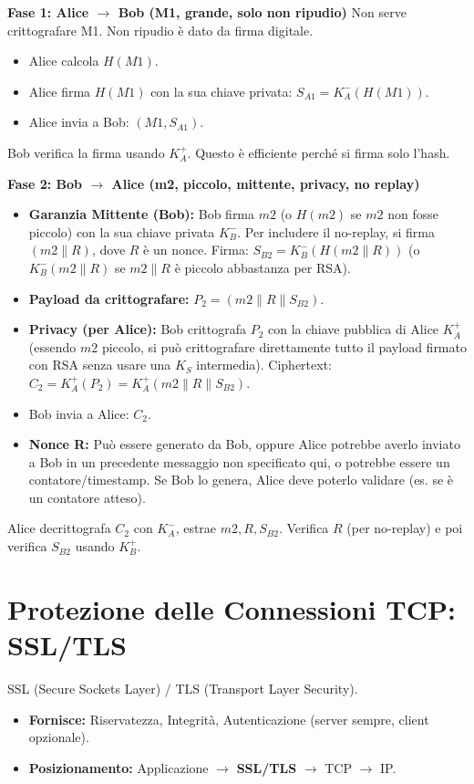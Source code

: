 \textbf{Fase 1: Alice $\rightarrow$ Bob (M1, grande, solo non ripudio)}
Non serve crittografare M1. Non ripudio è dato da firma digitale.
\begin{itemize}
    \item Alice calcola $H(M1)$.
    \item Alice firma $H(M1)$ con la sua chiave privata: $S_{A1} = K_A^-(H(M1))$.
    \item Alice invia a Bob: $(M1, S_{A1})$.
\end{itemize}
Bob verifica la firma usando $K_A^+$. Questo è efficiente perché si firma solo l'hash.

\textbf{Fase 2: Bob $\rightarrow$ Alice (m2, piccolo, mittente, privacy, no replay)}
\begin{itemize}
    \item \textbf{Garanzia Mittente (Bob):} Bob firma $m2$ (o $H(m2)$ se $m2$ non fosse piccolo) con la sua chiave privata $K_B^-$. Per includere il no-replay, si firma $(m2 \| R)$, dove $R$ è un nonce. Firma: $S_{B2} = K_B^-(H(m2 \| R))$ (o $K_B^-(m2 \| R)$ se $m2 \| R$ è piccolo abbastanza per RSA).
    \item \textbf{Payload da crittografare:} $P_2 = (m2 \| R \| S_{B2})$.
    \item \textbf{Privacy (per Alice):} Bob crittografa $P_2$ con la chiave pubblica di Alice $K_A^+$ (essendo $m2$ piccolo, si può crittografare direttamente tutto il payload firmato con RSA senza usare una $K_S$ intermedia).
    Ciphertext: $C_2 = K_A^+(P_2) = K_A^+(m2 \| R \| S_{B2})$.
    \item Bob invia a Alice: $C_2$.
    \item \textbf{Nonce R:} Può essere generato da Bob, oppure Alice potrebbe averlo inviato a Bob in un precedente messaggio non specificato qui, o potrebbe essere un contatore/timestamp. Se Bob lo genera, Alice deve poterlo validare (es. se è un contatore atteso).
\end{itemize}
Alice decrittografa $C_2$ con $K_A^-$, estrae $m2, R, S_{B2}$. Verifica $R$ (per no-replay) e poi verifica $S_{B2}$ usando $K_B^+$.

\section{Protezione delle Connessioni TCP: SSL/TLS}
\label{sec:ssl_tls}
SSL (Secure Sockets Layer) / TLS (Transport Layer Security).

\begin{itemize}
    \item \textbf{Fornisce:} Riservatezza, Integrità, Autenticazione (server sempre, client opzionale).
    \item \textbf{Posizionamento:} Applicazione $\rightarrow$ \textbf{SSL/TLS} $\rightarrow$ TCP $\rightarrow$ IP.
\end{itemize}

